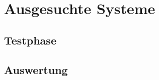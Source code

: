 \section{Ausgesuchte Systeme}
\label{sec:Ausgesuchte Systeme}

\subsection{Testphase}
\label{subsec:testphase}
\vfill

\subsection{Auswertung}
\label{subsec:Auswertung}
\vfill
